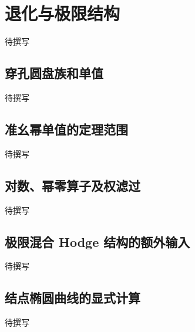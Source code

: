 
% 
% 
% 

\section{退化与极限结构}
\label{g4:sec:3204}

待撰写

\subsection{穿孔圆盘族和单值}
\label{g4:subsec:3204:01}
待撰写

\subsection{准幺幂单值的定理范围}
\label{g4:subsec:3204:02}
待撰写

\subsection{对数、幂零算子及权滤过}
\label{g4:subsec:3204:03}
待撰写

\subsection{极限混合 Hodge 结构的额外输入}
\label{g4:subsec:3204:04}
待撰写

\subsection{结点椭圆曲线的显式计算}
\label{g4:subsec:3204:05}
待撰写
